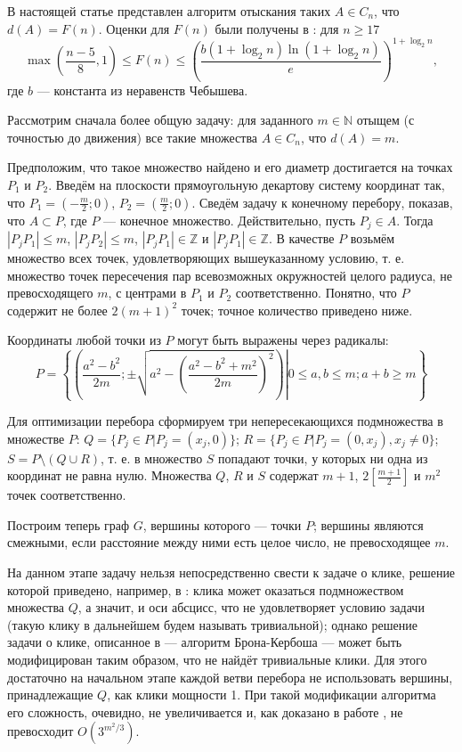 \documentclass{article}
\begin{document}
В настоящей статье представлен алгоритм отыскания таких $A \in C_n$, что $d(A) = F(n)$.
Оценки для $F(n)$ были получены в \cite{nashaStatya}:
для $n \geq 17$
	$$
		\max\left( \frac{n-5}{8}, 1 \right) \leq F(n) \leq \left( \frac{b (1+\log_2 n )\ln (1 + \log_2 n)}{e}\right)^{1+\log_2 n},
	$$
где $b$ --- константа из неравенств Чебышева.





Рассмотрим сначала более общую задачу: для заданного $m \in \mathbb{N}$ отыщем (с точностью до движения) все такие множества $A \in C_n$, что $d(A) = m$.

Предположим, что такое множество найдено и его диаметр достигается на точках $P_1$ и $P_2$.
Введём на плоскости прямоугольную декартову систему координат так, что $P_1 = \left(-\frac{m}{2}; 0 \right)$, $P_2 = \left(\frac{m}{2}; 0\right)$.
Сведём задачу к конечному перебору, показав, что $A \subset P$, где $P$ --- конечное множество.
Действительно, пусть $P_{j} \in A$.
Тогда $|P_{j} P_1| \leq m$, $|P_{j} P_2| \leq m$, $|P_{j} P_1| \in \mathbb{Z}$ и $|P_{j} P_1| \in \mathbb{Z}$.
В качестве $P$ возьмём множество всех точек, удовлетворяющих вышеуказанному условию, т. е. множество точек пересечения пар всевозможных окружностей целого радиуса, не превосходящего $m$, с центрами в $P_1$ и $P_2$ соответственно.
Понятно, что $P$ содержит не более $2(m+1)^2$ точек; точное количество приведено ниже.

Координаты любой точки из $P$ могут быть выражены через радикалы:
$$
	P = \left\{
		\left(\left.  \frac{a^2-b^2}{2m} ; \pm\sqrt{a^2  - \left( \frac{a^2-b^2+m^2}{2m}\right)^2}  \right)	\right| 0 \leq a, b \leq m ; a+b \geq m
	\right\}
$$


Для оптимизации перебора сформируем три непересекающихся подмножества в множестве $P$:
$Q = \{P_j \in P | P_j = (x_j, 0)\}$;
$R = \{P_j \in P | P_j = (0, x_j), x_j \neq 0\}$;
$S = P \setminus \left( Q \cup R\right)$,
т. е. в множество $S$ попадают точки, у которых ни одна из координат не равна нулю.
Множества $Q$, $R$ и $S$ содержат $m+1$, $2\left\lbrack\frac{m+1}{2}\right\rbrack$ и $m^2$ точек соответственно.

Построим теперь граф $G$, вершины которого --- точки $P$;
вершины являются смежными, если расстояние между ними есть целое число, не превосходящее $m$.

На данном этапе задачу нельзя непосредственно свести к задаче о клике, решение которой приведено, например, в \cite{BronKerbosh}:
клика может оказаться подмножеством множества $Q$, а значит, и оси абсцисс, что не удовлетворяет условию задачи (такую клику в дальнейшем будем называть тривиальной);
однако решение задачи о клике, описанное в \cite{BronKerbosh} --- алгоритм Брона-Кербоша --- может быть модифицирован таким образом, что не найдёт тривиальные клики.
Для этого достаточно на начальном этапе каждой ветви перебора не использовать вершины, принадлежащие $Q$, как клики мощности 1.
При такой модификации алгоритма его сложность, очевидно, не увеличивается и, как доказано в работе \cite{Tomita}, не превосходит $O(3^{m^2/3})$.
\end{document}
